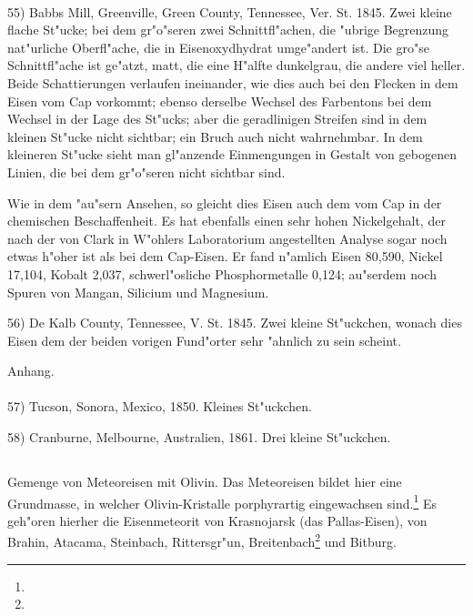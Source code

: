 \documentclass[a4paper, 11pt, oneside]{article}
\begin{document}
\paragraph{}
55) Babbs Mill, Greenville, Green County, Tennessee, Ver. St. 1845. Zwei kleine flache St"ucke; bei dem gr"o"seren zwei Schnittfl"achen, die "ubrige Begrenzung nat"urliche Oberfl"ache, die in Eisenoxydhydrat umge"andert ist. Die gro"se Schnittfl"ache ist ge"atzt, matt, die eine H"alfte dunkelgrau, die andere viel heller. Beide Schattierungen verlaufen ineinander, wie dies auch bei den Flecken in dem Eisen vom Cap vorkommt; ebenso derselbe Wechsel des Farbentons bei dem Wechsel in der Lage des St"ucks; aber die geradlinigen Streifen sind in dem kleinen St"ucke nicht sichtbar; ein Bruch auch nicht wahrnehmbar. In dem kleineren St"ucke sieht man gl"anzende Einmengungen in Gestalt von gebogenen Linien, die bei dem gr"o"seren nicht sichtbar sind.

Wie in dem "au"sern Ansehen, so gleicht dies Eisen auch dem vom Cap in der chemischen Beschaffenheit. Es hat ebenfalls einen sehr hohen Nickelgehalt, der nach der von Clark in W"ohlers Laboratorium angestellten Analyse sogar noch etwas h"oher ist als bei dem Cap-Eisen. Er fand n"amlich Eisen 80,590, Nickel 17,104, Kobalt 2,037, schwerl"osliche Phosphormetalle 0,124; au"serdem noch Spuren von Mangan, Silicium und Magnesium.

56) De Kalb County, Tennessee, V. St. 1845. Zwei kleine St"uckchen, wonach dies Eisen dem der beiden vorigen Fund"orter sehr "ahnlich zu sein scheint.
\begin{center}
Anhang. 
\end{center}
\paragraph{}
57) Tucson, Sonora, Mexico, 1850. Kleines St"uckchen.

58) Cranburne, Melbourne, Australien, 1861. Drei kleine St"uckchen.
\subsection{}
\paragraph{}
Gemenge von Meteoreisen mit Olivin. Das Meteoreisen bildet hier eine Grundmasse, in welcher Olivin-Kristalle porphyrartig eingewachsen sind.\footnote{} Es geh"oren hierher die Eisenmeteorit von Krasnojarsk (das Pallas-Eisen), von Brahin, Atacama, Steinbach, Rittersgr"un, Breitenbach\footnote{} und Bitburg.
\end{document}
